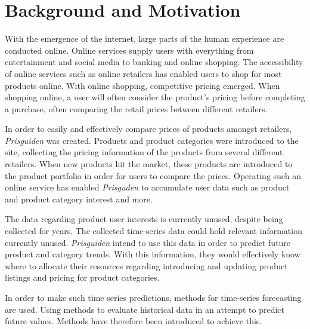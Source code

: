 \section{Background and Motivation}\label{cit}
\label{section:Introduction:BackgroundAndMotivation}

With the emergence of the internet, large parts of the human experience are conducted online.
Online services supply users with everything from entertainment and social media to banking and online shopping.
The accessibility of online services such as online retailers has enabled users to shop for most products online.
With online shopping, competitive pricing emerged.
When shopping online, a user will often consider the product's pricing before completing a purchase, often comparing the retail prices between different retailers.


In order to easily and effectively compare prices of products amongst retailers,
\textit{Prisguiden} was created.
Products and product categories were introduced to the site, collecting the pricing information of the products from several different retailers.
When new products hit the market, these products are introduced to the product portfolio in order for users to compare the prices.
Operating such an online service has enabled \textit{Prisguden} to accumulate user data such as product and product category interest and more.

The data regarding product user interests is currently unused, despite being collected for years.
The collected time-series data could hold relevant information currently unused.
\textit{Prisguiden} intend to use this data in order to predict future product and category trends.
With this information, they would effectively know where to allocate their resources regarding introducing and updating product listings and pricing for product categories.


In order to make such time series predictions, methods for time-series forecasting are used.
Using methods to evaluate historical data in an attempt to predict future values.
Methods have therefore been introduced to achieve this.


